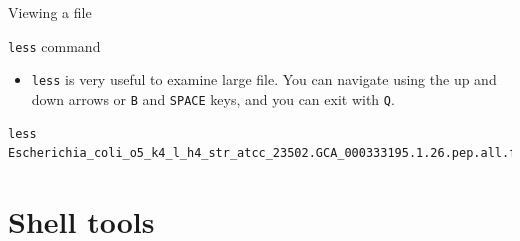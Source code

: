 \documentclass[big]{beamer}
\begin{document}
\begin{frame}[fragile,label=sec-2-29]{Viewing a file}
 \begin{block}{\texttt{less} command}
\begin{itemize}
\item \texttt{less} is very useful to examine large file. You can navigate using the up
and down arrows or \texttt{B} and \texttt{SPACE} keys, and you can exit with \texttt{Q}.
\end{itemize}
\begin{verbatim}
less Escherichia_coli_o5_k4_l_h4_str_atcc_23502.GCA_000333195.1.26.pep.all.fa
\end{verbatim}
\end{block}
\end{frame}
\section{Shell tools}
\label{sec-3}
\end{document}

